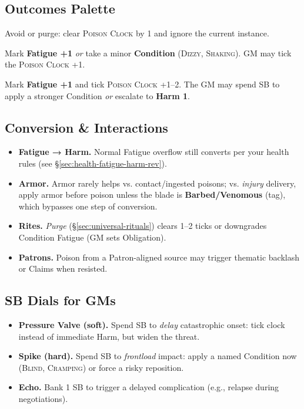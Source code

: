 \subsection*{Outcomes Palette}
\begin{description}[leftmargin=1.6em]
\item[\textbf{Strong Hit.}] Avoid or purge: clear \textsc{Poison Clock} by 1 and ignore the current instance.
\item[\textbf{Mixed.}] Mark \textbf{Fatigue +1} \emph{or} take a minor \textbf{Condition} (\textsc{Dizzy}, \textsc{Shaking}). GM may tick the \textsc{Poison Clock} +1.
\item[\textbf{Miss.}] Mark \textbf{Fatigue +1} and tick \textsc{Poison Clock} +1–2. The GM may spend SB to apply a stronger Condition \emph{or} escalate to \textbf{Harm 1}.
\end{description}

\subsection*{Conversion \& Interactions}
\begin{itemize}
\item \textbf{Fatigue → Harm.} Normal Fatigue overflow still converts per your health rules (see \S\ref{sec:health-fatigue-harm-rev}).
\item \textbf{Armor.} Armor rarely helps vs. contact/ingested poisons; vs. \emph{injury} delivery, apply armor before poison unless the blade is \textbf{Barbed/Venomous} (tag), which bypasses one step of conversion.
\item \textbf{Rites.} \emph{Purge} (\S\ref{sec:universal-rituals}) clears 1–2 ticks or downgrades Condition \textrightarrow{} Fatigue (GM sets Obligation).
\item \textbf{Patrons.} Poison from a Patron-aligned source may trigger thematic backlash or Claims when resisted.
\end{itemize}

\subsection*{SB Dials for GMs}
\begin{itemize}
\item \textbf{Pressure Valve (soft).} Spend SB to \emph{delay} catastrophic onset: tick clock instead of immediate Harm, but widen the threat.
\item \textbf{Spike (hard).} Spend SB to \emph{frontload} impact: apply a named Condition now (\textsc{Blind}, \textsc{Cramping}) or force a risky reposition.
\item \textbf{Echo.} Bank 1 SB to trigger a delayed complication (e.g., relapse during negotiations).
\end{itemize}


